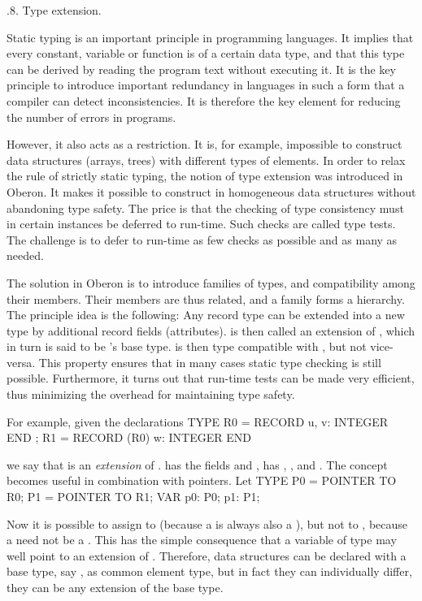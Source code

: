 .8. Type extension.

Static typing is an important principle in programming languages. It implies that every constant, variable or function is of a certain data type, and that this type can be derived by reading the program text without executing it. It is the key principle to introduce important redundancy in languages in such a form that a compiler can detect inconsistencies. It is therefore the key element for reducing the number of errors in programs.

However, it also acts as a restriction. It is, for example, impossible to construct data structures (arrays, trees) with different types of elements. In order to relax the rule of strictly static typing, the notion of type extension was introduced in Oberon. It makes it possible to construct in homogeneous data structures without abandoning type safety. The price is that the checking of type consistency must in certain instances be deferred to run-time. Such checks are called type tests. The challenge is to defer to run-time as few checks as possible and as many as needed.

The solution in Oberon is to introduce families of types, and compatibility among their members. Their members are thus related, and a family forms a hierarchy. The principle idea is the following: Any record type  can be extended into a new type  by additional record fields (attributes).  is then called an extension of , which in turn is said to be ’s base type.  is then type compatible with , but not vice-versa. This property ensures that in many cases static type checking is still possible. Furthermore, it turns out that run-time tests can be made very efficient, thus minimizing the overhead for maintaining type safety.

For example, given the declarations
\begintt
TYPE R0 = RECORD u, v: INTEGER END ;
     R1 = RECORD (R0) w: INTEGER END
\endtt

\noindent we say that  is an \emph{extension} of .  has the fields  and ,  has , , and . The concept becomes useful in combination with pointers. Let
\begintt
TYPE P0 = POINTER TO R0;
     P1 = POINTER TO R1;
VAR p0: P0; p1: P1;
\endtt

\noindent Now it is possible to assign  to  (because a  is always also a ), but not  to , because a  need not be a . This has the simple consequence that a variable of type  may well point to an extension of . Therefore, data structures can be declared with a base type, say , as common element type, but in fact they can individually differ, they can be any extension of the base type.

